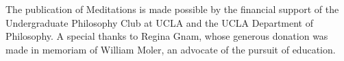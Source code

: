 \begin{center}
\vspace*{\fill}

{
\footnotesize
The publication of Meditations is made possible by the financial support of the Undergraduate Philosophy Club at UCLA and the UCLA Department of Philosophy. A special thanks to Regina Gnam, whose generous donation was made in memoriam of William Moler, an advocate of the pursuit of education.
}

\end{center}